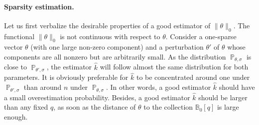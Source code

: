 \documentclass[twoside,11pt]{article}
\renewcommand{\P}{\operatorname{\mathbb{P}}}
\newcommand{\<}{\langle}
\renewcommand{\>}{\rangle}
\begin{document}
\paragraph{Sparsity estimation.} 
Let us first verbalize the desirable properties of a good estimator of $\|\theta\|_0$. The functional $\|\theta\|_0$ is not continuous with respect to $\theta$. 
Consider a one-sparse vector $\theta$ (with one large non-zero component) and a perturbation $\theta'$ of $\theta$ whose components are all nonzero but are arbitrarily small. As the distribution $\P_{\theta,\sigma}$ is close to $\P_{\theta',\sigma}$, the estimator $\widehat{k}$ will follow almost the same distribution for both parameters. It is obviously preferable for  $\widehat{k}$ to be concentrated around one under $\P_{\theta',\sigma}$ than  around $n$ under $\P_{\theta,\sigma}$. In other words,  a good estimator $\widehat{k}$ should have  a small overestimation probability. Besides, a good estimator $\widehat{k}$ should be larger than any fixed $q$, as soon as the distance of $\theta$ to the collection $\mathbb B_0[q]$ 
is large enough.
\end{document}
